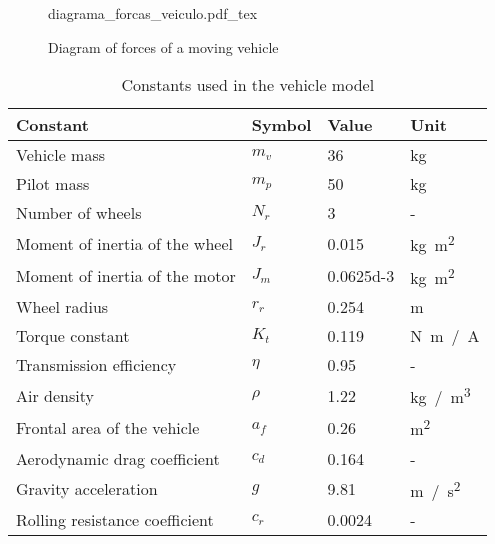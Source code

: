 \begin{figure}[h]
	\centering
	\begin{normalsize}
		{diagrama_forcas_veiculo.pdf_tex}
	\end{normalsize}
	\caption{Diagram of forces of a moving vehicle}
	\label{fig:diag_forcas_veiculo}
\end{figure}

\begin{table}[!h]
	\centering
    \caption{Constants used in the vehicle model}
	\label{tab:constantes}
	\begin{tabular}{llll}
		\toprule
		\textbf{Constant} & \textbf{Symbol} & \textbf{Value} & \textbf{Unit}\\
		\midrule
		Vehicle mass                    & $m_v$  & 36               & \si{kg}                \\
        Pilot mass		                & $m_p$  & 50               & \si{kg}                \\  
        Number of wheels                & $N_r$  & 3                & -                      \\
        Moment of inertia of the wheel  & $J_r$  & 0.015            & \si{kg.m^{2}}          \\
        Moment of inertia of the motor  & $J_m$  & \num{0.0625d-3}  & \si{kg.m^{2}}          \\
        Wheel radius                    & $r_r$  & 0.254            & \si{m}                 \\
        Torque constant                 & $K_t$  & 0.119            & \si{N.m / A}           \\
        Transmission efficiency         & $\eta$ & 0.95             & -                      \\
        Air density                     & $\rho$ & 1.22             & \si{kg / m^{3}}        \\
        Frontal area of the vehicle     & $a_f$  & 0.26             & \si{m^{2}}             \\
        Aerodynamic drag coefficient    & $c_d$  & 0.164            & -                      \\
        Gravity acceleration            & $g$    & 9.81             & \si{m / s^{2}}         \\
        Rolling resistance coefficient  & $c_r$  & 0.0024           & -                      \\
		\bottomrule
	\end{tabular}
\end{table}

